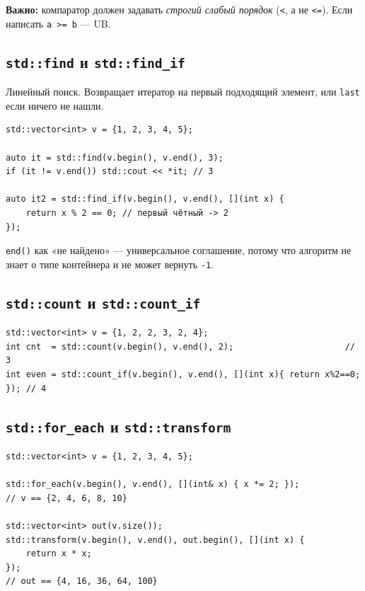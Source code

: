 \documentclass[a4paper,12pt]{article}
\begin{document}
\textbf{Важно:} компаратор должен задавать \textit{строгий слабый порядок}
(\texttt{<}, а не \texttt{<=}). Если написать \texttt{a >= b} --- UB.

\subsection{\texttt{std::find} и \texttt{std::find\_if}}

Линейный поиск. Возвращает итератор на первый подходящий элемент,
или \texttt{last} если ничего не нашли.

\begin{lstlisting}
std::vector<int> v = {1, 2, 3, 4, 5};

auto it = std::find(v.begin(), v.end(), 3);
if (it != v.end()) std::cout << *it; // 3

auto it2 = std::find_if(v.begin(), v.end(), [](int x) {
    return x % 2 == 0; // первый чётный -> 2
});
\end{lstlisting}

\texttt{end()} как «не найдено» --- универсальное соглашение, потому что
алгоритм не знает о типе контейнера и не может вернуть \texttt{-1}.

\subsection{\texttt{std::count} и \texttt{std::count\_if}}

\begin{lstlisting}
std::vector<int> v = {1, 2, 2, 3, 2, 4};
int cnt  = std::count(v.begin(), v.end(), 2);                      // 3
int even = std::count_if(v.begin(), v.end(), [](int x){ return x%2==0; }); // 4
\end{lstlisting}

\subsection{\texttt{std::for\_each} и \texttt{std::transform}}

\begin{lstlisting}
std::vector<int> v = {1, 2, 3, 4, 5};

std::for_each(v.begin(), v.end(), [](int& x) { x *= 2; });
// v == {2, 4, 6, 8, 10}

std::vector<int> out(v.size());
std::transform(v.begin(), v.end(), out.begin(), [](int x) {
    return x * x;
});
// out == {4, 16, 36, 64, 100}
\end{lstlisting}
\end{document}
